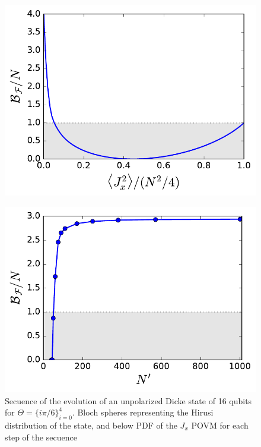 \begin{figure}
  \centering
  \includegraphics[scale=.65]{img/plots/LT_dicke_edge.pdf}
  \caption{}
  \label{fig:vd-secuence-evo}
\end{figure}

\begin{figure}
  \centering
  \includegraphics[scale=.65]{img/plots/LT_dicke_7900_asymp.pdf}
  \caption{Secuence of the evolution of an unpolarized Dicke state of 16 qubits for $\Theta=\{i\pi/6\}_{i=0}^4$. Bloch spheres representing the Hirusi distribution of the state, and below PDF of the $J_x$ POVM for each step of the secuence}
  \label{fig:vd-secuence-evo}
\end{figure}
